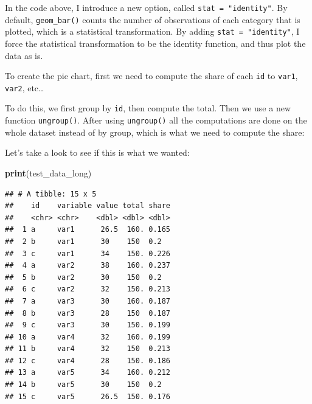 \documentclass[]{gitbook}
\newenvironment{Shaded}{\begin{snugshade}}{\end{snugshade}}
\newcommand{\DataTypeTok}[1]{\textcolor[rgb]{0.13,0.29,0.53}{#1}}
\newcommand{\KeywordTok}[1]{\textcolor[rgb]{0.13,0.29,0.53}{\textbf{#1}}}
\newcommand{\NormalTok}[1]{#1}
\newcommand{\OperatorTok}[1]{\textcolor[rgb]{0.81,0.36,0.00}{\textbf{#1}}}
\newcommand{\StringTok}[1]{\textcolor[rgb]{0.31,0.60,0.02}{#1}}
\theoremstyle{definition}
\theoremstyle{definition}
\theoremstyle{definition}
\theoremstyle{remark}
\begin{document}
In the code above, I introduce a new option, called
\texttt{stat\ =\ "identity"}. By default, \texttt{geom\_bar()} counts
the number of observations of each category that is plotted, which is a
statistical transformation. By adding \texttt{stat\ =\ "identity"}, I
force the statistical transformation to be the identity function, and
thus plot the data as is.

To create the pie chart, first we need to compute the share of each
\texttt{id} to \texttt{var1}, \texttt{var2}, etc\ldots{}

To do this, we first group by \texttt{id}, then compute the total. Then
we use a new function \texttt{ungroup()}. After using \texttt{ungroup()}
all the computations are done on the whole dataset instead of by group,
which is what we need to compute the share:

\begin{Shaded}
\end{Shaded}

Let's take a look to see if this is what we wanted:

\begin{Shaded}
\begin{Highlighting}[]
\KeywordTok{print}\NormalTok{(test_data_long)}
\end{Highlighting}
\end{Shaded}

\begin{verbatim}
## # A tibble: 15 x 5
##    id    variable value total share
##    <chr> <chr>    <dbl> <dbl> <dbl>
##  1 a     var1      26.5  160. 0.165
##  2 b     var1      30    150  0.2  
##  3 c     var1      34    150. 0.226
##  4 a     var2      38    160. 0.237
##  5 b     var2      30    150  0.2  
##  6 c     var2      32    150. 0.213
##  7 a     var3      30    160. 0.187
##  8 b     var3      28    150  0.187
##  9 c     var3      30    150. 0.199
## 10 a     var4      32    160. 0.199
## 11 b     var4      32    150  0.213
## 12 c     var4      28    150. 0.186
## 13 a     var5      34    160. 0.212
## 14 b     var5      30    150  0.2  
## 15 c     var5      26.5  150. 0.176
\end{verbatim}
\end{document}
